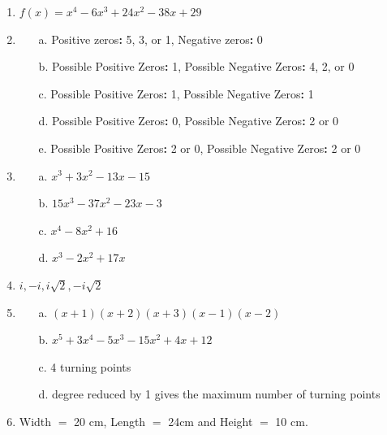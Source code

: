\begin{enumerate}
{$Q(-1) = 17$. The conditions as printed have no integer solution.}
\item $f(x) = x^4 - 6x^3 + 24x^2 - 38x + 29$
\item
\begin{enumerate}
  \item[a.] Positive zeros\textbf{:} 5, 3, or 1, Negative zeros\textbf{:} 0
  \item[b.] Possible Positive Zeros\textbf{:} 1, Possible Negative Zeros\textbf{:} 4, 2, or 0
  \item[c.] Possible Positive Zeros\textbf{:} 1, Possible Negative Zeros\textbf{:} 1
  \item[d.] Possible Positive Zeros\textbf{:} 0, Possible Negative Zeros\textbf{:} 2 or 0
  \item[e.] Possible Positive Zeros\textbf{:} 2 or 0, Possible Negative Zeros\textbf{:} 2 or 0
\end{enumerate}
\item
\begin{enumerate}
  \item[a.] $x^3 + 3x^2 - 13x - 15$
  \item[b.] $15x^3 - 37x^2 - 23x - 3$
  \item[c.] $x^4 - 8x^2 + 16$
  \item[d.] $x^3 - 2x^2 + 17x$
\end{enumerate}
\item $i, -i, i\sqrt{2}, -i\sqrt{2}$
\item
\begin{enumerate}
  \item[a.] $(x + 1)(x + 2)(x + 3)(x - 1)(x - 2)$
  \item[b.] $x^5 + 3x^4 - 5x^3 - 15x^2 + 4x + 12$
  \item[c.] 4 turning points
  \item[d.] degree reduced by 1 gives the maximum number of turning points
\end{enumerate}
\item Width $=$ 20 cm, Length $=$ 24cm and Height $=$ 10 cm.
\end{enumerate}
